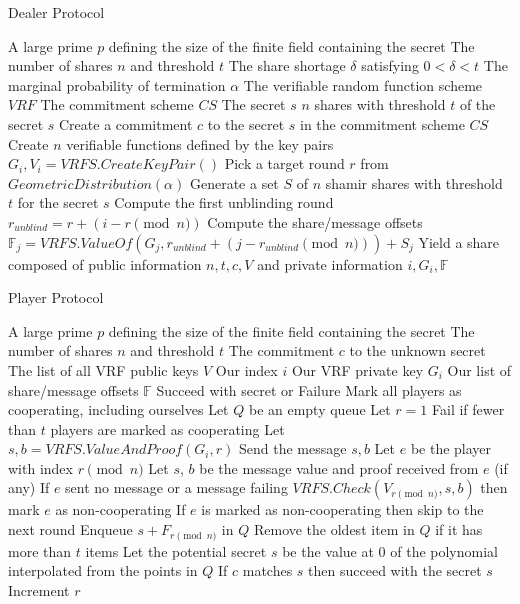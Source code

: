 \documentclass{dalcsthesis}
\begin{document}
\begin{algorithm}
  \caption{Dealer Protocol}
  \label{alg:ABC_Dealer}
  \begin{algorithmic}
    \INPUT A large prime $p$ defining the size of the finite field containing the secret
    \INPUT The number of shares $n$ and threshold $t$
    \INPUT The share shortage $\delta$ satisfying $0 < \delta < t$
    \INPUT The marginal probability of termination $\alpha$
    \INPUT The verifiable random function scheme $VRF$
    \INPUT The commitment scheme $CS$
    \INPUT The secret $s$
    \OUTPUT $n$ shares with threshold $t$ of the secret $s$
    \STATE Create a commitment $c$ to the secret $s$ in the commitment scheme $CS$
    \STATE Create $n$ verifiable functions defined by the key pairs $G_i, V_i = VRFS.CreateKeyPair()$
    \STATE Pick a target round $r$ from $GeometricDistribution(\alpha)$
      \STATE Generate a set $S$ of $n$ shamir shares with threshold $t$ for the secret $s$
      \STATE Compute the first unblinding round $r_{unblind} = r + (i-r \pmod{n})$
      \STATE Compute the share/message offsets $\mathbb{F}_j = VRFS.ValueOf(G_j, r_{unblind} + (j-r_{unblind} \pmod{n})) + S_j$
      \STATE Yield a share composed of public information $n, t, c, V$ and private information $i, G_i, \mathbb{F}$
    \ENDFOR
  \end{algorithmic}
\end{algorithm}
\begin{algorithm}
  \caption{Player Protocol}
  \label{alg:ABC_Player}
  \begin{algorithmic}
    \INPUT A large prime $p$ defining the size of the finite field containing the secret
    \INPUT The number of shares $n$ and threshold $t$
    \INPUT The commitment $c$ to the unknown secret
    \INPUT The list of all VRF public keys $V$
    \INPUT Our index $i$
    \INPUT Our VRF private key $G_i$
    \INPUT Our list of share/message offsets $\mathbb{F}$
    \OUTPUT Succeed with secret or Failure
    \STATE Mark all players as cooperating, including ourselves
    \STATE Let $Q$ be an empty queue
    \STATE Let $r = 1$
	  \STATE Fail if fewer than $t$ players are marked as cooperating
	  	 \STATE Let $s, b = VRFS.ValueAndProof(G_i, r)$ 
	  	 \STATE Send the message $s, b$
	  \ELSE
	     \STATE Let $e$ be the player with index $r \pmod{n}$
	     \STATE Let $s$, $b$ be the message value and proof received from $e$ (if any)
	     \STATE If $e$ sent no message or a message failing $VRFS.Check(V_{r \pmod{n}}, s, b)$ then mark $e$ as non-cooperating
	     \STATE If $e$ is marked as non-cooperating then skip to the next round
	   \ENDIF
	   \STATE Enqueue $s+F_{r \pmod{n}}$ in $Q$
       \STATE Remove the oldest item in $Q$ if it has more than $t$ items
	   \STATE Let the potential secret $s$ be the value at 0 of the polynomial interpolated from the points in $Q$
	   \STATE If $c$ matches $s$ then succeed with the secret $s$
       \STATE Increment $r$
	\ENDWHILE
  \end{algorithmic}
\end{algorithm}
\end{document}
